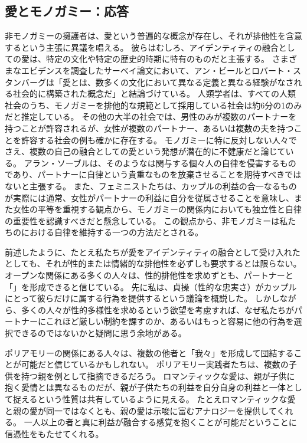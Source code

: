 \documentclass[paper=a4,book,openany]{jlreq}
\begin{document}
\subsection{愛とモノガミー：応答}

非モノガミーの擁護者は、愛という普遍的な概念が存在し、それが排他性を含意するという主張に異議を唱える。
彼らはむしろ、アイデンティティの融合としての愛は、特定の文化や特定の歴史的時期に特有のものだと主張する。
さまざまなエビデンスを調査したサーベイ論文において、アン・ビールとロバート・スタンバーグは「愛とは、数多くの文化において異なる定義と異なる経験がなされる社会的に構築された概念だ」と結論づけている\citep[p.433]{beall95:_social_const_love}。
人類学者は、すべての人類社会のうち、モノガミーを排他的な規範として採用している社会は約6分の1のみだと推定している。
その他の大半の社会では、男性のみが複数のパートナーを持つことが許容されるが、女性が複数のパートナー、あるいは複数の夫を持つことを許容する社会の例も確かに存在する。
モノガミーに特に反対しない人々でさえ、複数の自己の融合としての愛という発想が潜在的に不健康だと論じている。
アラン・ソーブルは、そのようなは関与する個々人の自律を侵害するものであり、パートナーに自律という貴重なものを放棄させることを期待すべきではないと主張する\citep{soble97:_union_auton_concer}。
また、フェミニストたちは、カップルの利益の合一なるものが実際には通常、女性がパートナーの利益に自分を従属させることを意味し、また女性の平等を重視する観点から、モノガミーの関係内においても独立性と自律の重要性を認識すべきだと懸念している\citep{friedman98:_roman_love_person_auton}。
この観点から、非モノガミーは私たちのにおける自律を維持する一つの方法だとされる。

前述したように、たとえ私たちが愛をアイデンティティの融合として受け入れたとしても、それが性的または情緒的な排他性を必ずしも要求するとは限らない。
オープンな関係にある多くの人々は、性的排他性を求めずとも、パートナーと「」を形成できると信じている。
先に私は、貞操（性的な忠実さ）がカップルにとって彼らだけに属する行為を提供するという議論を概説した。
しかしながら、多くの人々が性的多様性を求めるという欲望を考慮すれば、なぜ私たちがパートナーにこれほど厳しい制約を課すのか、あるいはもっと容易に他の行為を選択できるのではないかと疑問に思う余地がある。

ポリアモリーの関係にある人々は、複数の他者と「我々」を形成して団結することが可能だと信じているかもしれない。
ポリアモリー実践者たちは、複数の子供を持つ親を例として指摘できるだろう。
ロマンティックな愛は、親が子供に抱く愛情とは異なるものだが、親が子供たちの利益を自分自身の利益と一体として捉えるという性質は共有しているように見える。
たとえロマンティックな愛と親の愛が同一ではなくとも、親の愛は示唆に富むアナロジーを提供してくれる。
一人以上の者と真に利益が融合する感覚を抱くことが可能だということに信憑性をもたせてくれる。
\end{document}
